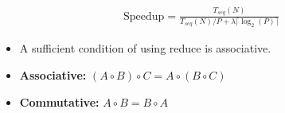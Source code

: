\documentclass[../main.tex]{subfiles}
\begin{document}
\begin{align*}
	\text{Speedup} = \frac{T_{seq}(N)}{T_{seq}(N) / P + \lambda \lceil \log_2(P) \rceil}
\end{align*}

\begin{itemize}
\item A sufficient condition of using reduce is associative.
	\item \textbf{Associative:} \((A \circ B) \circ C = A \circ (B \circ C)\)
	\item \textbf{Commutative:} \(A \circ B = B \circ A\)
\end{itemize}
\end{document}
